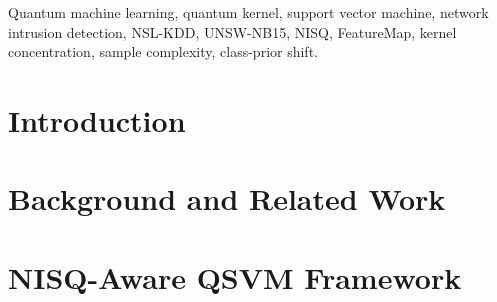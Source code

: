 \begin{abstract}
\begin{revbody}
the enriched arm cannot be run past $N=2000$ without runs sharing samples, and
where the two arms overlap the tree ensembles lead under both priors. The selection rule transfers to
UNSW-NB15 unchanged and returns six qubits rather than four, while the
sample-complexity reversal does not transfer. Finally, spending a larger feature
budget forces a wider circuit, and widening destroys the kernel: at eight qubits
all 48 paired comparisons favour the classical model, with a mechanism visible
directly in the Gram matrix, whose off-diagonal dispersion decays faster for the
\ZZ{} map than for its entanglement-free control, by the factor of two that
phase-term counting predicts at $K=20$ and by 3.3 at $K=80$, where the collapse
occurs. We report the result as a regime map, including the regimes in which the
quantum kernel loses.
\end{revbody}
\end{abstract}

\begin{IEEEkeywords}
Quantum machine learning, quantum kernel, support vector machine, network
intrusion detection, NSL-KDD, UNSW-NB15, NISQ, \ZZ{}FeatureMap, kernel
concentration, sample complexity, class-prior shift.
\end{IEEEkeywords}

\section{Introduction}
\label{sec:intro}


\section{Background and Related Work}
\label{sec:related}

\section{NISQ-Aware QSVM Framework}
\label{sec:framework}


